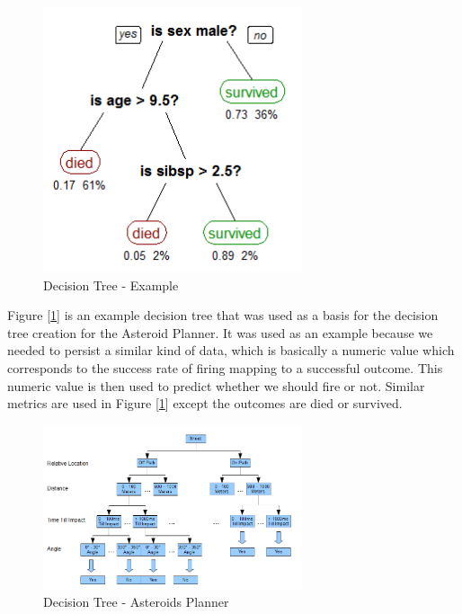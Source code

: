 \documentclass[10pt,final,conference]{article}
\begin{document}
\begin{figure}
\centering
\includegraphics[width=3.0in]{./CART_tree_titanic_survivors.png}
\caption{Decision Tree - Example}
\label{fig_decision_tree_example}
\end{figure}

Figure [\ref{fig_decision_tree_example}] is an example decision tree that was used as a basis for the decision tree creation for the Asteroid Planner\cite{wikiDecisionTreeLearning}.  It was used as an example because we needed to persist a similar kind of data, which is basically a numeric value which corresponds to the success rate of firing mapping to a successful outcome.  This numeric value is then used to predict whether we should fire or not.  Similar metrics are used in Figure [\ref{fig_decision_tree_example}] except the outcomes are died or survived.

\begin{figure}
\centering
\includegraphics[width=3.0in]{./DecisionTree.png}
\caption{Decision Tree - Asteroids Planner}
\label{fig_decision_tree_asteroids}
\end{figure}
\end{document}
